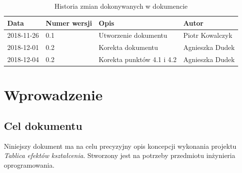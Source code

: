 \documentclass{article}
\begin{document}
\begin{titlepage}






\end{titlepage}

\addtocounter{page}{1}
\newpage

\begin{table}[h!]
	\begin{center}
		\caption{Historia zmian dokonywanych w dokumencie}
		\begin{tabular}{|l|l|l|l|}
			\hline
			Data & Numer wersji & Opis & Autor \\
			\hline \hline
			2018-11-26 & 0.1 & Utworzenie dokumentu & Piotr Kowalczyk \\
			\hline 
			2018-12-01 & 0.2 & Korekta dokumentu & Agnieszka Dudek \\
			\hline
			2018-12-04 & 0.2 & Korekta punktów 4.1 i 4.2 & Agnieszka Dudek \\
			\hline
	      \end{tabular}
	\end{center}
\end{table}	

\tableofcontents

\newpage


\section{Wprowadzenie}

\subsection{Cel dokumentu}
Niniejszy dokument ma na celu precyzyjny opis koncepcji wykonania projektu \textit{Tablica efektów kształcenia}.
Stworzony jest na potrzeby przedmiotu inżynieria oprogramowania.
\end{document}
